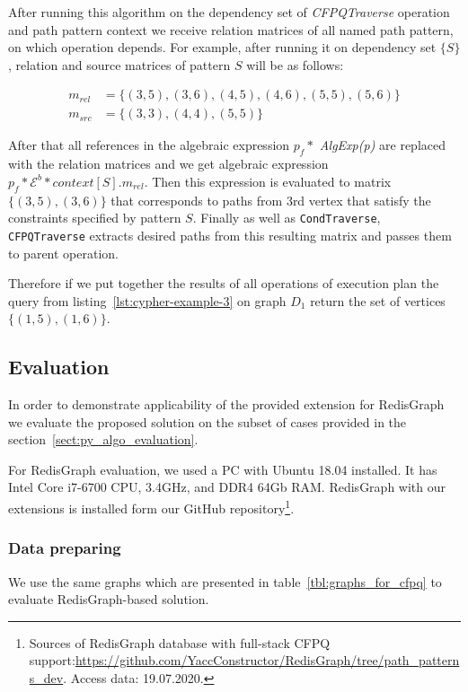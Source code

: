 After running this algorithm on the dependency set of \textit{CFPQTraverse} operation and path pattern context we receive relation matrices of all named path pattern, on which operation depends. For example, after running it on dependency set $\{S\}$, relation and source matrices of pattern $S$ will be as follows:

\begin{align*}
m_{rel} &= \{(3, 5), (3, 6), (4, 5), (4, 6), (5, 5), (5, 6)\} \\
m_{src} &= \{(3, 3), (4, 4), (5, 5)\}
\end{align*}

After that all references in the algebraic expression $p_f *$ \textit{Alg\-Exp(p)} are replaced with the relation matrices and we get algebraic expression $p_f * \mathcal{E}^b * context[S].m_{rel}$. Then this expression is evaluated to matrix $\{(3, 5), (3, 6)\}$ that corresponds to paths from 3rd vertex that satisfy the constraints specified by pattern $S$. Finally as well as \lstinline{CondTraverse}, \lstinline{CFPQTraverse} extracts desired paths from this resulting matrix and passes them to parent operation.

Therefore if we put together the results of all operations of execution plan the query from listing~\ref{lst:cypher-example-3} on graph $D_1$ return the set of vertices $\{(1, 5), (1, 6)\}$.

\subsection{Evaluation}

In order to demonstrate applicability of the provided extension for RedisGraph we evaluate the proposed solution on the subset of cases provided in the section~\ref{sect:py_algo_evaluation}.

For RedisGraph evaluation, we used a PC with Ubuntu 18.04 installed.
It has Intel Core i7-6700 CPU, 3.4GHz, and DDR4 64Gb RAM. 
RedisGraph with our extensions is installed form our GitHub repository\footnote{Sources of RedisGraph database with full-stack CFPQ support:\url{https://github.com/YaccConstructor/RedisGraph/tree/path_patterns_dev}. Access data: 19.07.2020.}. 

\subsubsection{Data preparing}

We use the same graphs which are presented in table~\ref{tbl:graphs_for_cfpq} to evaluate RedisGraph-based solution.

